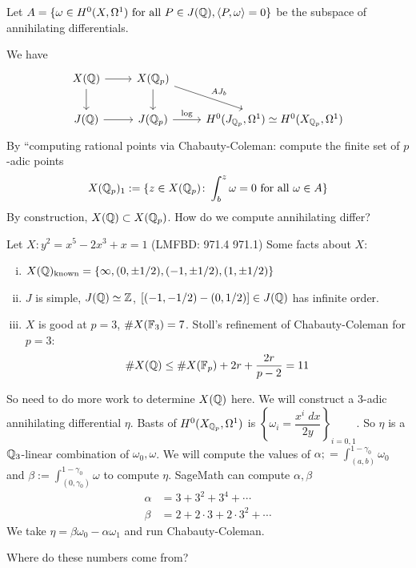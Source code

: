 \begin{dfn}
Let $A= \{ \omega \in H^0(X,\Omega^1) \text{ for all } P \in J(\mathbb{Q}), \langle P,\omega \rangle=0 \}$ be the subspace of annihilating differentials.  
\end{dfn}


We have
	\[
	\begin{tikzcd}
	X(\Q) \arrow{d} \arrow{r} & X(\Q_p) \arrow{d} \arrow{dr}{AJ_b} \\
	J(\Q) \arrow{r} & J(\Q_p) \arrow{r}{\log} &  H^0(J_{\Q_p},\Omega^1) \simeq H^0(X_{\Q_p}, \Omega^1)
	\end{tikzcd}
	\]
By ``computing rational points via Chabauty-Coleman: compute the finite set of $p$-adic points
	\[
	X(\mathbb{Q}_p)_1:= \{ z \in X(\mathbb{Q}_p) \colon \int_b^z \omega= 0 \text{ for all } \omega \in A \}
	\]
By construction, $X(\mathbb{Q}) \subset X(\mathbb{Q}_p)$. How do we compute annihilating differ?


\begin{ex}
Let $X: y^2= x^5-2x^3+x=1$ (LMFBD: 971.4 971.1) Some facts about $X$:
\begin{enumerate}[(i)]
\item $X(\mathbb{Q})_{\text{known}}= \{ \infty, (0,\pm1/2), (-1,\pm1/2), (1,\pm 1/2)\}$
\item $J$ is simple, $J(\mathbb{Q}) \simeq \mathbb{Z}$, $[(-1,-1/2)-(0,1/2)] \in J(\mathbb{Q})$ has infinite order.
\item $X$ is good at $p=3$, $\#X(\mathbb{F}_3)=7$. Stoll's refinement of Chabauty-Coleman for $p= 3$:
	\[
	\#X(\mathbb{Q}) \leq \#X(\mathbb{F}_p) + 2 r + \dfrac{2r}{p-2}= 11
	\]
\end{enumerate}
So need to do more work to determine $X(\mathbb{Q})$ here. We will construct a 3-adic annihilating differential $\eta$. Basts of $H^0(X_{\mathbb{Q}_p},\Omega^1)$ is $\left\{ \omega_i = \dfrac{x^i \;dx}{2y} \right\}_{i=0,1}$. So $\eta$ is a $\mathbb{Q}_3$-linear combination of $\omega_0, \omega$. We will compute the values of $\alpha;= \int_{(a,b)}^{1-\gamma_0} \omega_0$ and $\beta:= \int_{(0,\gamma_0)}^{1-\gamma_0} \omega$ to compute $\eta$. SageMath can compute $\alpha, \beta$
	\[
	\begin{aligned}
	\alpha&= 3+3^2+3^4+\cdots \\
	\beta&= 2 + 2\cdot 3 + 2 \cdot 3^2 + \cdots
	\end{aligned}
	\]
We take $\eta= \beta \omega_0 - \alpha \omega_1$ and run Chabauty-Coleman. 
\end{ex}


Where do these numbers come from?



